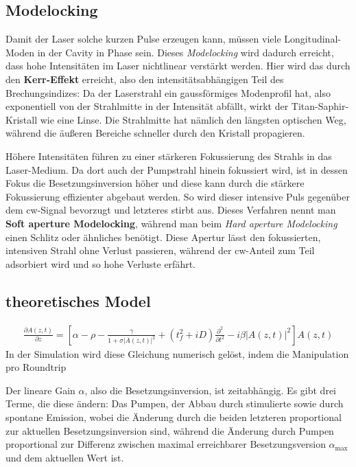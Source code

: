 \documentclass[bachelor,       %
               twoside,        %
               BCOR10mm,       %
               english,ngerman, %
               ]{GAUBM}
\begin{document}
\subsection{Modelocking}
Damit der Laser solche kurzen Pulse erzeugen kann, müssen viele Longitudinal-Moden in der Cavity in Phase sein.
Dieses \emph{Modelocking} wird dadurch erreicht, dass hohe Intensitäten im Laser nichtlinear verstärkt werden.
Hier wird das durch den \textbf{Kerr-Effekt} erreicht, also den intensitätsabhängigen Teil des Brechungsindizes: 
Da der Laserstrahl ein gaussförmiges Modenprofil hat, also exponentiell von der Strahlmitte in der Intensität abfällt, wirkt der Titan-Saphir-Kristall wie eine Linse.
Die Strahlmitte hat nämlich den längsten optischen Weg, während die äußeren Bereiche schneller durch den Kristall propagieren.

Höhere Intensitäten führen zu einer stärkeren Fokussierung des Strahls in das Laser-Medium.
Da dort auch der Pumpstrahl hinein fokussiert wird, ist in dessen Fokus die Besetzungsinversion höher und diese kann durch die stärkere Fokussierung effizienter abgebaut werden.
So wird dieser intensive Puls gegenüber dem cw-Signal bevorzugt und letzteres stirbt aus.
Dieses Verfahren nennt man \textbf{Soft aperture Modelocking}, während man beim \textit{Hard aperture Modelocking} einen Schlitz oder ähnliches benötigt.
Diese Apertur lässt den fokussierten, intensiven Strahl ohne Verlust passieren, während der cw-Anteil zum Teil adsorbiert wird und so hohe Verluste erfährt.

\subsection{theoretisches Model}

\begin{align}
	\frac{\partial A(z,t)}{\partial z}=\left[\alpha-\rho-\frac{\gamma}{1+\sigma|A(z,t)|^2}+(t_f^2+iD)\frac{\partial^2}{\partial t^2}-i\beta |A(z,t)|^2\right]A(z,t)
\end{align}
In der Simulation wird diese Gleichung numerisch gelöst, indem die Manipulation pro Roundtrip 

Der lineare Gain $\alpha$, also die Besetzungsinversion, ist zeitabhängig.
Es gibt drei Terme, die diese ändern:
Das Pumpen, der Abbau durch stimulierte sowie durch spontane Emission, wobei die Änderung durch die beiden letzteren proportional zur aktuellen Besetzungsinversion sind, während die Änderung durch Pumpen proportional zur Differenz zwischen maximal erreichbarer Besetzungsversion $\alpha_\text{max}$ und dem aktuellen Wert ist.
\end{document}
